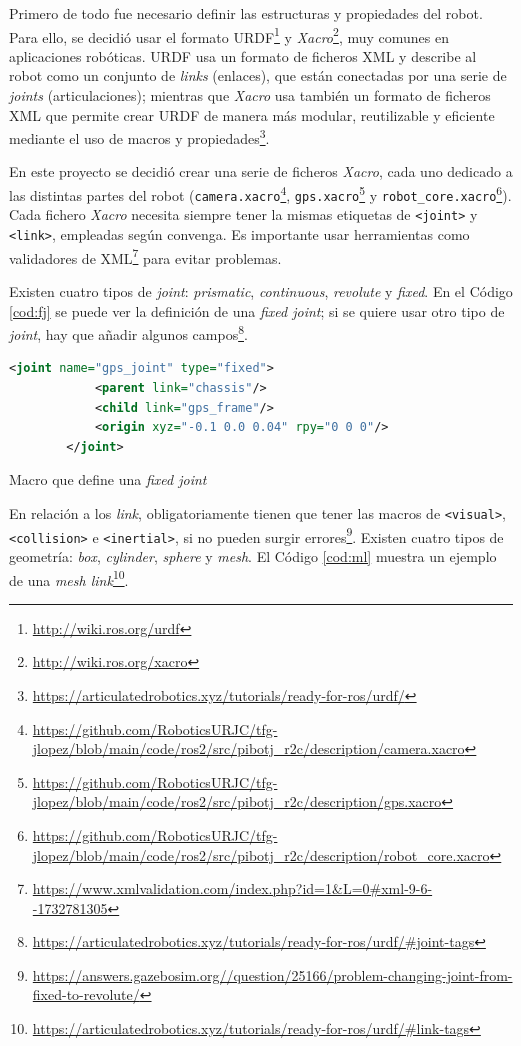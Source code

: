 Primero de todo fue necesario definir las estructuras y propiedades del robot. Para ello, se decidió usar el formato \ac{URDF}\footnote{\url{http://wiki.ros.org/urdf}} y \textit{Xacro}\footnote{\url{http://wiki.ros.org/xacro}}, muy comunes en aplicaciones robóticas. \acs{URDF} usa un formato de ficheros XML y describe al robot como un conjunto de \textit{links} (enlaces), que están conectadas por una serie de \textit{joints} (articulaciones); mientras que \textit{Xacro} usa también un formato de ficheros XML que permite crear URDF de manera más modular, reutilizable y eficiente mediante el uso de macros y propiedades\footnote{\url{https://articulatedrobotics.xyz/tutorials/ready-for-ros/urdf/}}.

En este proyecto se decidió crear una serie de ficheros \textit{Xacro}, cada uno dedicado a las distintas partes del robot (\verb|camera.xacro|\footnote{\url{https://github.com/RoboticsURJC/tfg-jlopez/blob/main/code/ros2/src/pibotj_r2c/description/camera.xacro}}, \verb|gps.xacro|\footnote{\url{https://github.com/RoboticsURJC/tfg-jlopez/blob/main/code/ros2/src/pibotj_r2c/description/gps.xacro}} y \verb|robot_core.xacro|\footnote{\url{https://github.com/RoboticsURJC/tfg-jlopez/blob/main/code/ros2/src/pibotj_r2c/description/robot_core.xacro}}). Cada fichero \textit{Xacro} necesita siempre tener la mismas etiquetas de \verb|<joint>| y \verb|<link>|, empleadas según convenga. Es importante usar herramientas como validadores de XML\footnote{\url{https://www.xmlvalidation.com/index.php?id=1&L=0\#xml-9-6--1732781305}} para evitar problemas.

Existen cuatro tipos de \textit{joint}: \textit{prismatic}, \textit{continuous}, \textit{revolute} y \textit{fixed}. En el Código \ref{cod:fj} se puede ver la definición de una \textit{fixed joint}; si se quiere usar otro tipo de \textit{joint}, hay que añadir algunos campos\footnote{\url{https://articulatedrobotics.xyz/tutorials/ready-for-ros/urdf/\#joint-tags}}.

\begin{code}[h]
	\begin{lstlisting}[language=xml]
		<joint name="gps_joint" type="fixed">
			<parent link="chassis"/>
			<child link="gps_frame"/>
			<origin xyz="-0.1 0.0 0.04" rpy="0 0 0"/>
		</joint>
	\end{lstlisting}
	\caption[Macro que define \textit{fixed joint}]{Macro que define una \textit{fixed joint}}
	\label{cod:fj}
			\end{code}

En relación a los \textit{link}, obligatoriamente tienen que tener las macros de \verb|<visual>|, \verb|<collision>| e \verb|<inertial>|, si no pueden surgir errores\footnote{\url{https://answers.gazebosim.org//question/25166/problem-changing-joint-from-fixed-to-revolute/}}. Existen cuatro tipos de geometría: \textit{box}, \textit{cylinder}, \textit{sphere} y \textit{mesh}. El Código \ref{cod:ml} muestra un ejemplo de una \textit{mesh link}\footnote{\url{https://articulatedrobotics.xyz/tutorials/ready-for-ros/urdf/\#link-tags}}.

